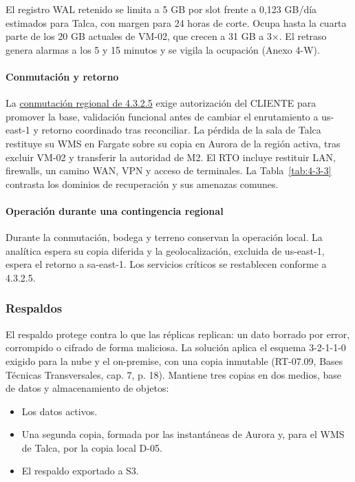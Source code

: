 El registro WAL retenido se limita a 5 GB por slot frente a 0,123 GB/día estimados para Talca, con margen para 24 horas de corte. Ocupa hasta la cuarta parte de los 20 GB actuales de VM-02, que crecen a 31 GB a 3$\times$. El retraso genera alarmas a los 5 y 15 minutos y se vigila la ocupación (Anexo 4-W).

\paragraph{Conmutación y retorno}

La \hyperref[tab:4-3-6]{conmutación regional de 4.3.2.5} exige autorización del CLIENTE para promover la base, validación funcional antes de cambiar el enrutamiento a us-east-1 y retorno coordinado tras reconciliar. La pérdida de la sala de Talca restituye su WMS en Fargate sobre su copia en Aurora de la región activa, tras excluir VM-02 y transferir la autoridad de M2. El RTO incluye restituir LAN, firewalls, un camino WAN, VPN y acceso de terminales. La Tabla~\ref{tab:4-3-3} contrasta los dominios de recuperación y sus amenazas comunes.

\paragraph{Operación durante una contingencia regional}

Durante la conmutación, bodega y terreno conservan la operación local. La analítica espera su copia diferida y la geolocalización, excluida de us-east-1, espera el retorno a sa-east-1. Los servicios críticos se restablecen conforme a 4.3.2.5.

\subsubsection{Respaldos}
\label{sub:5-respaldos-esquema-3-2-1-1-0-rnf-20-07}

El respaldo protege contra lo que las réplicas replican: un dato borrado por error, corrompido o cifrado de forma maliciosa. La solución aplica el esquema 3-2-1-1-0 exigido para la nube y el on-premise, con una copia inmutable (RT-07.09, Bases Técnicas Transversales, cap. 7, p. 18). Mantiene tres copias en dos medios, base de datos y almacenamiento de objetos:

\begin{itemize}
  \item Los datos activos.
  \item Una segunda copia, formada por las instantáneas de Aurora y, para el WMS de Talca, por la copia local D-05.
  \item El respaldo exportado a S3.
\end{itemize}

